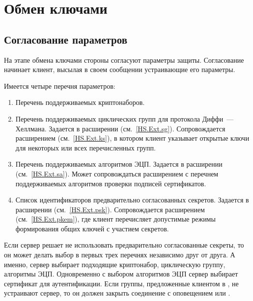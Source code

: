 \section{Обмен ключами}\label{HS.KeyExchange}

\subsection{Согласование параметров}\label{HS.Negot} 

На этапе обмена ключами стороны согласуют параметры защиты.
%
Согласование начинает клиент, высылая в своем сообщении 
 устраивающие его параметры.

Имеется четыре перечня параметров:
\begin{enumerate}
\item
Перечень поддерживаемых криптонаборов.

\item
Перечень поддерживаемых циклических групп для протокола Диффи~--- Хеллмана.
Задается в расширении  (см.~\ref{HS.Ext.sg}). 
Сопровождается расширением  (см.~\ref{HS.Ext.ks}), 
в котором клиент указывает открытые ключи для некоторых или всех перечисленных 
групп.

\item
Перечень поддерживаемых алгоритмов ЭЦП. Задается в расширении 
 (см.~\ref{HS.Ext.sa}).
%
Может сопровождаться расширением  
с перечнем поддерживаемых алгоритмов проверки подписей сертификатов.

\item
Список идентификаторов предварительно согласованных секретов.
Задается в расширении  (см.~\ref{HS.Ext.psk}).
%
Сопровождается расширением  
(см.~\ref{HS.Ext.pkem}), где клиент перечисляет допустимые режимы формирования  
общих ключей с участием секретов.
\end{enumerate}

Если сервер решает не использовать предварительно согласованные секреты, то он 
может делать выбор в первых трех перечнях независимо друг от друга. А именно, 
сервер выбирает подходящие криптонабор, циклическую группу, алгоритмы ЭЦП. 
Одновременно с выбором алгоритмов ЭЦП сервер выбирает сертификат для 
аутентификации.
%
Если группы, предложенные клиентом в , не 
устраивают сервер, то он должен закрыть соединение с оповещением 
 или 
.

